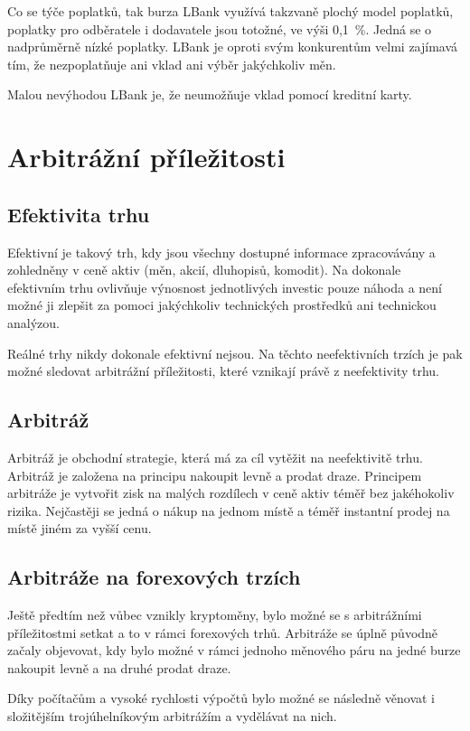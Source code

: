 \documentclass[thesis=B,czech]{FITthesis}[2019/03/21]
\begin{document}
Co se týče poplatků, tak burza LBank využívá takzvaně plochý model poplatků, poplatky pro odběratele i dodavatele jsou totožné, ve výši 0,1~\%. Jedná se o nadprůměrně nízké poplatky. LBank je oproti svým konkurentům velmi zajímavá tím, že nezpoplatňuje ani vklad ani výběr jakýchkoliv měn. 

Malou nevýhodou LBank je, že neumožňuje vklad pomocí kreditní karty. \cite{cryptowisser_lbank}


\section{Arbitrážní příležitosti}
\subsection{Efektivita trhu}
Efektivní je takový trh, kdy jsou všechny dostupné informace zpracovávány a zohledněny v ceně aktiv (měn, akcií, dluhopisů, komodit). Na dokonale efektivním trhu ovlivňuje výnosnost jednotlivých investic pouze náhoda a není možné ji zlepšit za pomoci jakýchkoliv technických prostředků ani technickou analýzou. \cite{efektivita_trhu}

Reálné trhy nikdy dokonale efektivní nejsou. Na těchto neefektivních trzích je pak možné sledovat arbitrážní příležitosti, které vznikají právě z neefektivity trhu. \cite{what_is_arbitage}

\subsection{Arbitráž}
Arbitráž je obchodní strategie, která má za cíl vytěžit na neefektivitě trhu. Arbitráž je založena na principu nakoupit levně a prodat draze. Principem arbitráže je vytvořit zisk na malých rozdílech v ceně aktiv téměř bez jakéhokoliv rizika. Nejčastěji se jedná o nákup na jednom místě a téměř instantní prodej na místě jiném za vyšší cenu. \cite{Capital}

\subsection{Arbitráže na forexových trzích}
Ještě předtím než vůbec vznikly kryptoměny, bylo možné se s arbitrážními příležitostmi setkat a to v rámci forexových trhů. Arbitráže se úplně původně začaly objevovat, kdy bylo možné v rámci jednoho měnového páru na jedné burze nakoupit levně a na druhé prodat draze. 

Díky počítačům a vysoké rychlosti výpočtů bylo možné se následně věnovat i složitějším trojúhelníkovým arbitrážím a vydělávat na nich. \cite{investopedia_forex_arbitrage}
\end{document}
